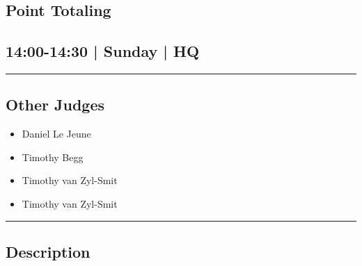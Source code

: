 \documentclass[10pt, A5]{article}
\begin{document}
		\begin{framed}
			\begin{minipage}{\textwidth}

			\setcounter{section}{117}
							\section{Point Totaling}
						
			\subsection*{14:00-14:30 | Sunday | HQ}

			\vspace{0.25cm}
			\hrule
			\vspace{0.25cm}


			\subsection*{Other Judges}
							

				\begin{multicols}{2}

			\begin{itemize}
											\item Daniel Le Jeune
											\item Timothy Begg
											\item Timothy van Zyl-Smit
								\end{itemize}

			\vfill\null
			\columnbreak

			\begin{itemize}
											\item Timothy van Zyl-Smit
								\end{itemize}

			\vfill\null

			\end{multicols}

			\vspace{0.25cm}
			\hrule
			\vspace{0.25cm}

			\begin{minipage}{\textwidth}
			\subsection*{\faListAlt \: Description}
			
			\end{minipage}


	\end{minipage}
	\end{framed}
\end{document}

